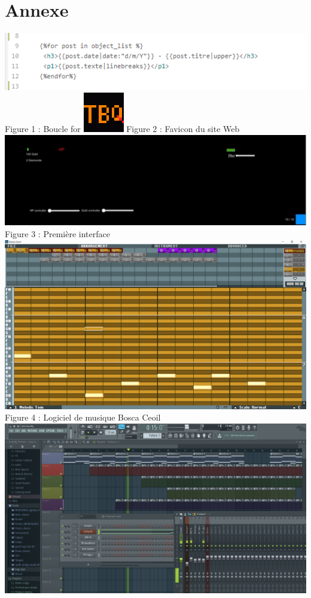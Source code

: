 \documentclass[]{extarticle}
\begin{document}
\section{Annexe}
\bigbreak
\bigbreak
\begin{center}
\includegraphics[scale = 1]{boucle_for.png}
\smallbreak
Figure 1 : Boucle for
\bigbreak
\bigbreak
\includegraphics[scale = 1]{image_TBQ.png}
\smallbreak
Figure 2 : Favicon du site Web
\bigbreak
\bigbreak
\includegraphics[scale = 0.32]{interface.jpg}
\smallbreak
Figure 3 : Première interface
\bigbreak
\bigbreak
\includegraphics[scale = 0.18]{ceoil.png}
\smallbreak
Figure 4 : Logiciel de musique Bosca Ceoil
\bigbreak
\bigbreak
\includegraphics[scale = 0.18]{fruitloop.png}

\end{center}
\end{document}
